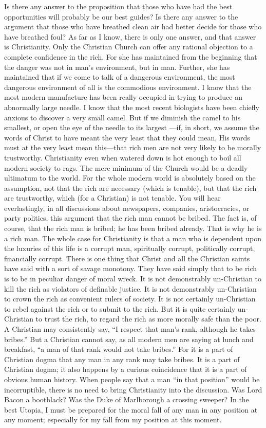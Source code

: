 Is there any answer to the proposition that those who have had the best opportunities will probably be our best guides? Is there any answer to the argument that those who have breathed clean air had better decide for those who have breathed foul? As far as I know, there is only one answer, and that answer is Christianity. Only the Christian Church can offer any rational objection to a complete confidence in the rich. For she has maintained from the beginning that the danger was not in man’s environment, but in man. Further, she has maintained that if we come to talk of a dangerous environment, the most dangerous environment of all is the commodious environment. I know that the most modern manufacture has been really occupied in trying to produce an abnormally large needle. I know that the most recent biologists have been chiefly anxious to discover a very small camel. But if we diminish the camel to his smallest, or open the eye of the needle to its largest —if, in short, we assume the words of Christ to have meant the very least that they could mean, His words must at the very least mean this—that rich men are not very likely to be morally trustworthy. Christianity even when watered down is hot enough to boil all modern society to rags. The mere minimum of the Church would be a deadly ultimatum to the world. For the whole modern world is absolutely based on the assumption, not that the rich are necessary (which is tenable), but that the rich are trustworthy, which (for a Christian) is not tenable. You will hear everlastingly, in all discussions about newspapers, companies, aristocracies, or party politics, this argument that the rich man cannot be bribed. The fact is, of course, that the rich man is bribed; he has been bribed already. That is why he is a rich man. The whole case for Christianity is that a man who is dependent upon the luxuries of this life is a corrupt man, spiritually corrupt, politically corrupt, financially corrupt. There is one thing that Christ and all the Christian saints have said with a sort of savage monotony. They have said simply that to be rich is to be in peculiar danger of moral wreck. It is not demonstrably un-Christian to kill the rich as violators of definable justice. It is not demonstrably un-Christian to crown the rich as convenient rulers of society. It is not certainly un-Christian to rebel against the rich or to submit to the rich. But it is quite certainly un-Christian to trust the rich, to regard the rich as more morally safe than the poor. A Christian may consistently say, “I respect that man’s rank, although he takes bribes.” But a Christian cannot say, as all modern men are saying at lunch and breakfast, “a man of that rank would not take bribes.” For it is a part of Christian dogma that any man in any rank may take bribes. It is a part of Christian dogma; it also happens by a curious coincidence that it is a part of obvious human history. When people say that a man “in that position” would be incorruptible, there is no need to bring Christianity into the discussion. Was Lord Bacon a bootblack? Was the Duke of Marlborough a crossing sweeper? In the best Utopia, I must be prepared for the moral fall of any man in any position at any moment; especially for my fall from my position at this moment.

